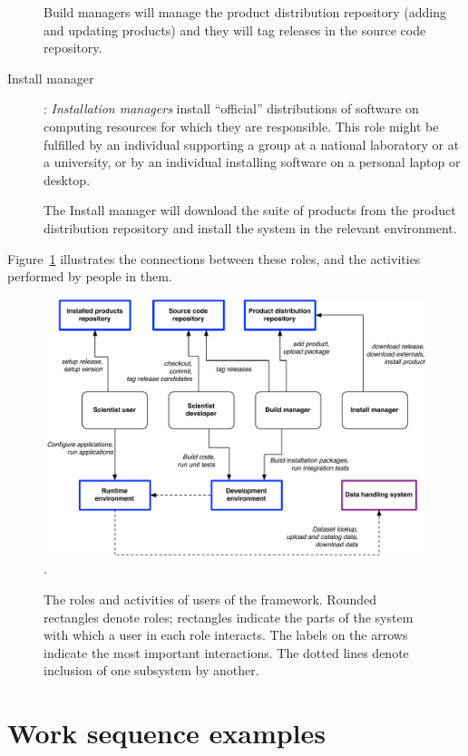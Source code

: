 \documentclass{memarticle}
\newcommand{\cosmosis}{\name{CosmoSIS}\xspace}
\begin{document}
\begin{description}
  Build managers will manage the {product distribution repository} (adding and updating products) and they will tag releases in the source code repository.


\item[Install manager]: \emph{Installation managers} install
  ``official'' distributions of software on computing resources for
  which they are responsible. This role might be fulfilled by an
  individual supporting a group at a national laboratory or at a
  university, or by an individual installing software on a personal
laptop or desktop.


  The Install manager will download the suite of products from the product distribution repository and install the system in the relevant environment.


\end{description}

Figure~\ref{fig:roles} illustrates the connections between these roles, and the activities
performed by people in them.
\begin{figure}
  \centering
  \includegraphics[width=\textwidth]{roles}.
  \caption{The roles and activities of users of the \cosmosis
    framework. Rounded rectangles denote roles; rectangles indicate
    the parts of the \cosmosis system with which a user in each role
    interacts. The labels on the arrows indicate the most important
    interactions. The dotted lines denote inclusion of one subsystem
    by another.}
  \label{fig:roles}
\end{figure}

\section{Work sequence examples}
\end{document}
